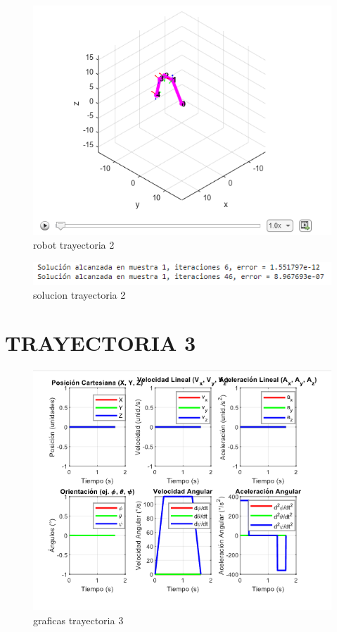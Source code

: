 \begin{figure} [h]
	\centering
	\includegraphics[width=0.9\linewidth]{"../cinematica inversa/img/robot trayectoria 2"}
	\caption{robot trayectoria 2}
	\label{fig:robot-trayectoria-2}
\end{figure}

\newpage

\begin{figure} [h]
	\centering
	\includegraphics[width=0.9\linewidth]{"../cinematica inversa/img/solucion trayectoria 2"}
	\caption{solucion trayectoria 2}
	\label{fig:solucion-trayectoria-2}
\end{figure}

\newpage

\section{TRAYECTORIA 3}
\begin{figure} [h]
	\centering
	\includegraphics[width=0.9\linewidth]{"../cinematica inversa/img/graficas_taryectoria 3"}
	\caption{graficas trayectoria 3}
	\label{fig:graficastaryectoria-3}
\end{figure}

